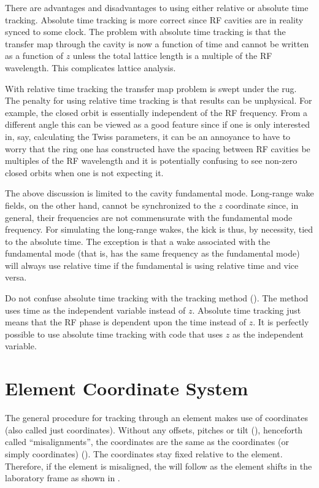 There are advantages and disadvantages to using either relative or
absolute time tracking. Absolute time tracking is more correct since
RF cavities are in reality synced to some clock. The problem with
absolute time tracking is that the transfer map through the cavity is
now a function of time and cannot be written as a function of $z$
unless the total lattice length is a multiple of the RF wavelength.
This complicates lattice analysis.

With relative time tracking the transfer map problem is swept under
the rug. The penalty for using relative time tracking is that results
can be unphysical. For example, the closed orbit is essentially
independent of the RF frequency. From a different angle this can be
viewed as a good feature since if one is only interested in, say,
calculating the Twiss parameters, it can be an annoyance to have to
worry that the ring one has constructed have the spacing between RF
cavities be multiples of the RF wavelength and it is potentially
confusing to see non-zero closed orbits when one is not expecting it.

The above discussion is limited to the cavity fundamental mode.
Long-range wake fields, on the other hand, cannot be synchronized to
the $z$ coordinate since, in general, their frequencies are not
commensurate with the fundamental mode frequency. For simulating the
long-range wakes, the kick is thus, by necessity, tied to the absolute
time. The exception is that a wake associated with the fundamental
mode (that is, has the same frequency as the fundamental mode) will
always use relative time if the fundamental is using relative time and
vice versa.

Do not confuse absolute time tracking with the 
tracking method (). The  method uses
time as the independent variable instead of $z$. Absolute time
tracking just means that the RF phase is dependent upon the time
instead of $z$. It is perfectly possible to use absolute time
tracking with code that uses $z$ as the independent variable.

\section{Element Coordinate System}
\label{s:ele.coords}

The general procedure for tracking through an element makes use of
 coordinates (also called just 
coordinates). Without any offsets, pitches or tilt (), henceforth
called ``misalignments'', the  coordinates are the same
as the  coordinates (or simply 
coordinates) (). The  coordinates stay fixed
relative to the element. Therefore, if the element is misaligned, the
 will follow as the element shifts in the
laboratory frame as shown in .


